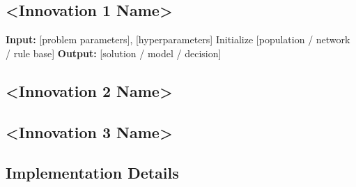 \documentclass[journal,onecolumn,draftcls]{IEEEtran}
\begin{document}
\subsection{<Innovation 1 Name>}
\label{sec:method-innov1}


\begin{algorithm}[t]
  \caption{[Core Component] of the Proposed Method}
  \label{alg:core}
  \begin{algorithmic}[1]
    \STATE \textbf{Input:} [problem parameters], [hyperparameters]
    \STATE Initialize [population / network / rule base]
    \ENDFOR
    \STATE \textbf{Output:} [solution / model / decision]
  \end{algorithmic}
\end{algorithm}

\subsection{<Innovation 2 Name>}
\label{sec:method-innov2}


\subsection{<Innovation 3 Name>}
\label{sec:method-innov3}


\subsection{Implementation Details}
\label{sec:method-implementation}


\end{document}
